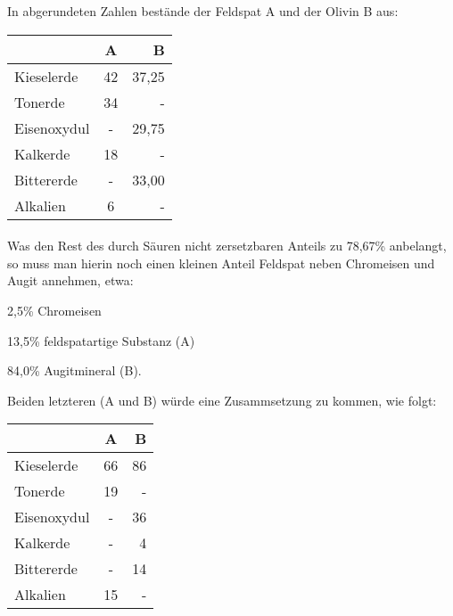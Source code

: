 \documentclass[a4paper, 11pt, oneside]{article}
\begin{document}
In abgerundeten Zahlen bestände der Feldspat A und der Olivin B aus:
\begin{center}
    \begin{tabular}{ |l|c|r| } 
    \hline
    & A & B\\
    \hline\hline
    Kieselerde & 42 & 37,25\\\hline
    Tonerde & 34 & -\\\hline
    Eisenoxydul & - & 29,75\\\hline
    Kalkerde & 18 & -\\\hline
    Bittererde & - & 33,00\\\hline
    Alkalien & 6 & -\\
    \hline
    \end{tabular}
\end{center}
\paragraph{}
Was den Rest des durch Säuren nicht zersetzbaren Anteils zu 78,67\% anbelangt, so muss man hierin noch einen kleinen Anteil Feldspat neben Chromeisen und Augit annehmen, etwa:

2,5\% Chromeisen

13,5\% feldspatartige Substanz (A)

84,0\% Augitmineral (B).

Beiden letzteren (A und B) würde eine Zusammsetzung zu kommen, wie folgt:
\begin{center}
    \begin{tabular}{ |l|c|r| } 
    \hline
    & A & B\\
    \hline\hline
    Kieselerde & 66 & 86\\\hline
    Tonerde & 19 & -\\\hline
    Eisenoxydul & - & 36\\\hline
    Kalkerde & - & 4\\\hline
    Bittererde & - & 14\\\hline
    Alkalien & 15 & -\\
    \hline
    \end{tabular}
\end{center}
\end{document}
